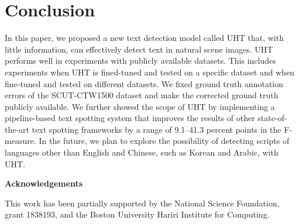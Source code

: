 \documentclass[10pt,twocolumn,letterpaper]{article}
\begin{document}
\section{Conclusion}

In this paper, we proposed a new text detection model called UHT that, with little information, can effectively detect text in natural scene images. UHT performs well in experiments with publicly available datasets. This includes experiments when UHT is fined-tuned and tested on a specific dataset and when fine-tuned and tested on different datasets. We fixed ground truth annotation errors of the SCUT-CTW1500 dataset and make the corrected ground truth publicly available. We further showed the scope of UHT by implementing a pipeline-based text spotting system that
improves the results of other state-of-the-art text spotting frameworks by a range of 9.1--41.3 percent points in the F-measure.
In the future, we plan to explore the possibility of detecting scripts of languages other than 
English and Chinese, such as Korean and Arabic, with UHT.




\vspace*{.4cm}

\noindent
{\bf Acknowledgements}


This work has been partially supported by the National Science Foundation, grant 1838193, and the Boston University Hariri Institute for Computing.




{\small


}
\end{document}
